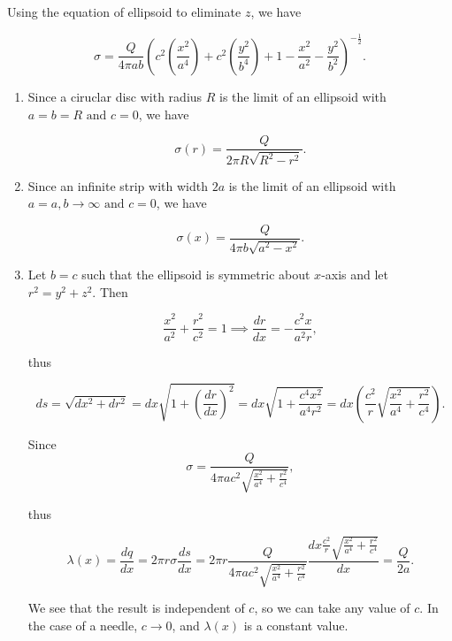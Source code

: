 \documentclass[english,a4paper,12pt]{report}
\begin{document}
{Using the equation of ellipsoid to eliminate \(z\), we have
		
\begin{equation}
    \sigma = \frac{Q}{4\pi ab} \left(c^2\left(\frac{x^2}{a^4}\right) + c^2\left(\frac{y^2}{b^4} \right) + 1 - \frac{x^2}{a^2}  - \frac{y^2}{b^2} \right)^{-\frac{1}{2} }.
\end{equation}

\begin{enumerate}
    \item Since a ciruclar disc with radius \(R\) is the limit of an ellipsoid with \(a = b = R \text { and } c = 0\), we have  

    \begin{equation}
        \sigma (r) = \frac{Q}{2\pi R\sqrt{R^2-r^2} }.
    \end{equation}

    \item Since an infinite strip with width \(2a\) is the limit of an ellipsoid with \(a = a, b \to \infty \text { and } c = 0\), we have  

    \begin{equation}
        \sigma (x) = \frac{Q}{4\pi b\sqrt{a^2 - x^2} }  .
    \end{equation}

    \item Let \(b = c\) such that the ellipsoid is symmetric about \(x\)-axis and let \(r^2 = y^2 + z^2\). Then

    \begin{equation}
        \frac{x^2}{a^2} + \frac{r^2}{c^2} = 1 \implies \frac{dr}{dx} = -\frac{c^2x}{a^2r},
    \end{equation}
    
    thus

    \begin{equation}
        ds = \sqrt{dx^2+dr^2} = dx \sqrt{1+\left(\frac{dr}{dx} \right)^2} = dx \sqrt{1+\frac{c^4x^2}{a^4r^2} } = dx \left( \frac{c^2}{r} \sqrt{\frac{x^2}{a^4} + \frac{r^2}{c^4} }\right) . 
    \end{equation}
    
    Since 
    \begin{equation}
        \sigma = \frac{Q}{4\pi ac^2\sqrt{\frac{x^2}{a^4} + \frac{r^2}{c^4} } },
    \end{equation}

    thus
    
    \begin{equation}
        \lambda (x) = \frac{dq}{dx} = 2\pi r\sigma \frac{ds}{dx}  = 2\pi r \frac{Q}{4\pi ac^2\sqrt{\frac{x^2}{a^4} + \frac{r^2}{c^4} } }\frac{dx \frac{c^2}{r} \sqrt{\frac{x^2}{a^4} + \frac{r^2}{c^4} } 
        }{dx} = \frac{Q}{2a} .
    \end{equation}
    
    We see that the result is independent of \(c\), so we can take any value of \(c\). In the case of a needle, \(c \rightarrow  0\), and \(\lambda (x)\) is a constant value.
\end{enumerate}~} 
\end{document}
